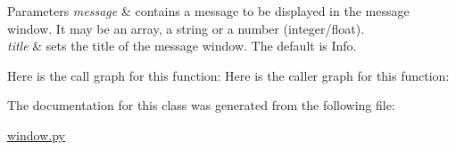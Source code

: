 \begin{DoxyParams}{Parameters}
{\em message} & contains a message to be displayed in the message window. It may be an array, a string or a number (integer/float). \\
\hline
{\em title} & sets the title of the message window. The default is \textquotesingle{}Info\textquotesingle{}. \\
\hline
\end{DoxyParams}
Here is the call graph for this function\+:
Here is the caller graph for this function\+:


The documentation for this class was generated from the following file\+:\begin{DoxyCompactItemize}
\item 
\mbox{\hyperlink{window_8py}{window.\+py}}\end{DoxyCompactItemize}
